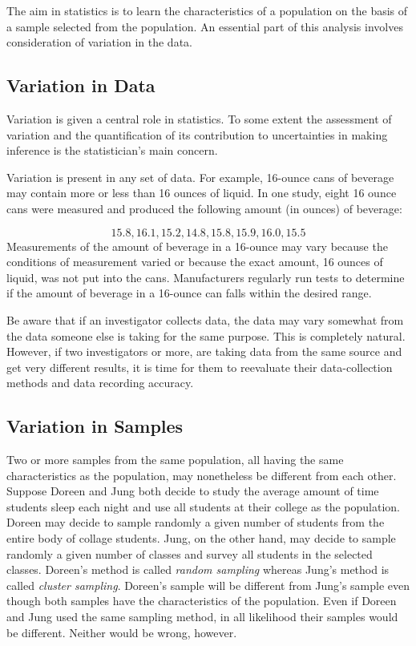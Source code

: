 \documentclass[]{krantz}
\theoremstyle{definition}
\theoremstyle{definition}
\theoremstyle{definition}
\theoremstyle{remark}
\begin{document}
The aim in statistics is to learn the characteristics of a population on
the basis of a sample selected from the population. An essential part of
this analysis involves consideration of variation in the data.

\hypertarget{variation-in-data}{%
\subsection{Variation in Data}\label{variation-in-data}}

Variation is given a central role in statistics. To some extent the
assessment of variation and the quantification of its contribution to
uncertainties in making inference is the statistician's main concern.

Variation is present in any set of data. For example, 16-ounce cans of
beverage may contain more or less than 16 ounces of liquid. In one
study, eight 16 ounce cans were measured and produced the following
amount (in ounces) of beverage:

\[15.8,16.1,15.2,14.8,15.8,15.9,16.0,15.5\]
Measurements of the amount of beverage in a 16-ounce may vary because
the conditions of measurement varied or because the exact amount, 16
ounces of liquid, was not put into the cans. Manufacturers regularly run
tests to determine if the amount of beverage in a 16-ounce can falls
within the desired range.

Be aware that if an investigator collects data, the data may vary
somewhat from the data someone else is taking for the same purpose. This
is completely natural. However, if two investigators or more, are taking
data from the same source and get very different results, it is time for
them to reevaluate their data-collection methods and data recording
accuracy.

\hypertarget{variation-in-samples}{%
\subsection{Variation in Samples}\label{variation-in-samples}}

Two or more samples from the same population, all having the same
characteristics as the population, may nonetheless be different from
each other. Suppose Doreen and Jung both decide to study the average
amount of time students sleep each night and use all students at their
college as the population. Doreen may decide to sample randomly a given
number of students from the entire body of collage students. Jung, on
the other hand, may decide to sample randomly a given number of classes
and survey all students in the selected classes. Doreen's method is
called \emph{random sampling} whereas Jung's method is called \emph{cluster
sampling}. Doreen's sample will be different from Jung's sample even
though both samples have the characteristics of the population. Even if
Doreen and Jung used the same sampling method, in all likelihood their
samples would be different. Neither would be wrong, however.
\end{document}
